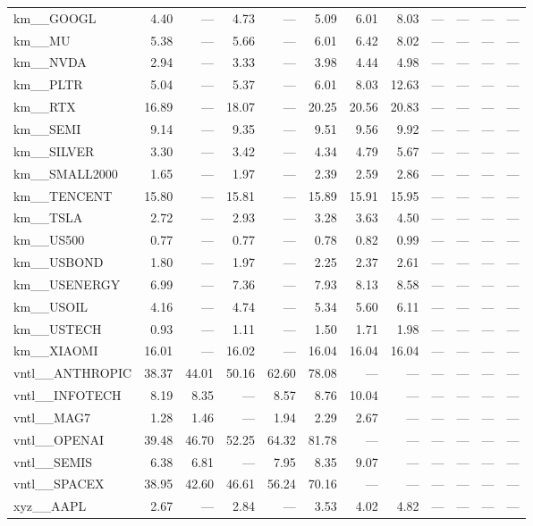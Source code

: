 \begin{table}[h]
\begin{tabular}{lrrrrrrrrrrr}
km__GOOGL & 4.40 & — & 4.73 & — & 5.09 & 6.01 & 8.03 & — & — & — & — \\
km__MU & 5.38 & — & 5.66 & — & 6.01 & 6.42 & 8.02 & — & — & — & — \\
km__NVDA & 2.94 & — & 3.33 & — & 3.98 & 4.44 & 4.98 & — & — & — & — \\
km__PLTR & 5.04 & — & 5.37 & — & 6.01 & 8.03 & 12.63 & — & — & — & — \\
km__RTX & 16.89 & — & 18.07 & — & 20.25 & 20.56 & 20.83 & — & — & — & — \\
km__SEMI & 9.14 & — & 9.35 & — & 9.51 & 9.56 & 9.92 & — & — & — & — \\
km__SILVER & 3.30 & — & 3.42 & — & 4.34 & 4.79 & 5.67 & — & — & — & — \\
km__SMALL2000 & 1.65 & — & 1.97 & — & 2.39 & 2.59 & 2.86 & — & — & — & — \\
km__TENCENT & 15.80 & — & 15.81 & — & 15.89 & 15.91 & 15.95 & — & — & — & — \\
km__TSLA & 2.72 & — & 2.93 & — & 3.28 & 3.63 & 4.50 & — & — & — & — \\
km__US500 & 0.77 & — & 0.77 & — & 0.78 & 0.82 & 0.99 & — & — & — & — \\
km__USBOND & 1.80 & — & 1.97 & — & 2.25 & 2.37 & 2.61 & — & — & — & — \\
km__USENERGY & 6.99 & — & 7.36 & — & 7.93 & 8.13 & 8.58 & — & — & — & — \\
km__USOIL & 4.16 & — & 4.74 & — & 5.34 & 5.60 & 6.11 & — & — & — & — \\
km__USTECH & 0.93 & — & 1.11 & — & 1.50 & 1.71 & 1.98 & — & — & — & — \\
km__XIAOMI & 16.01 & — & 16.02 & — & 16.04 & 16.04 & 16.04 & — & — & — & — \\
vntl__ANTHROPIC & 38.37 & 44.01 & 50.16 & 62.60 & 78.08 & — & — & — & — & — & — \\
vntl__INFOTECH & 8.19 & 8.35 & — & 8.57 & 8.76 & 10.04 & — & — & — & — & — \\
vntl__MAG7 & 1.28 & 1.46 & — & 1.94 & 2.29 & 2.67 & — & — & — & — & — \\
vntl__OPENAI & 39.48 & 46.70 & 52.25 & 64.32 & 81.78 & — & — & — & — & — & — \\
vntl__SEMIS & 6.38 & 6.81 & — & 7.95 & 8.35 & 9.07 & — & — & — & — & — \\
vntl__SPACEX & 38.95 & 42.60 & 46.61 & 56.24 & 70.16 & — & — & — & — & — & — \\
xyz__AAPL & 2.67 & — & 2.84 & — & 3.53 & 4.02 & 4.82 & — & — & — & — \\

\end{tabular}
\end{table}
